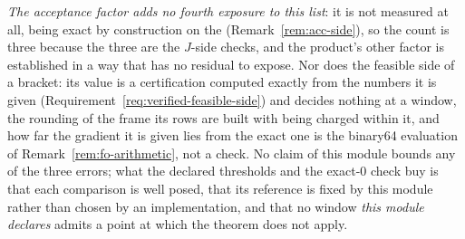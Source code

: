 \begin{remark}
\emph{The acceptance factor adds no fourth exposure to this list}: it is not
measured at all, being exact by construction on the 
(Remark~\ref{rem:acc-side}), so the count is three because the three are the
$J$-side checks, and the product's other factor is established in a way
that has no residual to expose. Nor does the feasible side of a bracket:
its value is a certification computed exactly from the numbers it is given
(Requirement~\ref{req:verified-feasible-side}) and decides nothing at a
window, the rounding of the frame its rows are built with being charged
within it, and how far the gradient it is given lies from the exact one is
the binary64 evaluation of Remark~\ref{rem:fo-arithmetic}, not a check. No
claim of this module bounds any of the
three errors; what the declared thresholds and the exact-$0$ check buy is
that each comparison is well posed, that its reference is fixed by this
module rather than chosen by an implementation, and that no window
\emph{this module declares} admits a point at which the theorem does not
apply.
\end{remark}
